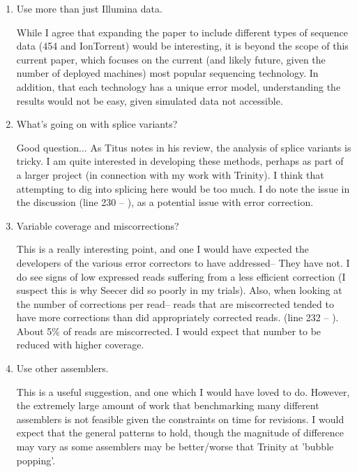 \documentclass[11pt]{article}
\begin{document}
\begin{enumerate}
\item Use more than just Illumina data. 
\begin{addmargin}[2em]{2em}
While I agree that expanding the paper to include different types of sequence data (454 and IonTorrent) would be interesting, it is beyond the scope of this current paper, which focuses on the current (and likely future, given the number of deployed machines) most popular sequencing technology. In addition, that each technology has a unique error model, understanding the results would not be easy, given simulated data not accessible. 
\end{addmargin}

\item What's going on with splice variants? 
\begin{addmargin}[2em]{2em}
Good question... As Titus notes in his review, the analysis of splice variants is tricky. I am quite interested in developing these methods, perhaps as part of a larger project (in connection with my work with Trinity). I think that attempting to dig into splicing here would be too much. I do note the issue in the discussion (line 230 -- ), as a potential issue with error correction. 
\end{addmargin}


\item Variable coverage and miscorrections? 
\begin{addmargin}[2em]{2em}
This is a really interesting point, and one I would have expected the developers of the various error correctors to have addressed-- They have not. I do see signs of low expressed reads suffering from a less efficient correction (I suspect this is why Seecer did so poorly in my trials).  Also, when looking at the number of corrections per read-- reads that are miscorrected tended to have more corrections than did appropriately corrected reads. (line 232 -- ). About 5\% of reads are miscorrected. I would expect that number to be reduced with higher coverage. 
\end{addmargin}

\item Use other assemblers. 
\begin{addmargin}[2em]{2em}
This is a useful suggestion, and one which I would have loved to do. However, the extremely large amount of work that benchmarking many different assemblers is not feasible given the constraints on time for revisions. I would expect that the general patterns to hold, though the magnitude of difference may vary as some assemblers may be better/worse that Trinity at 'bubble popping'.
\end{addmargin}


\end{enumerate}
\end{document}
